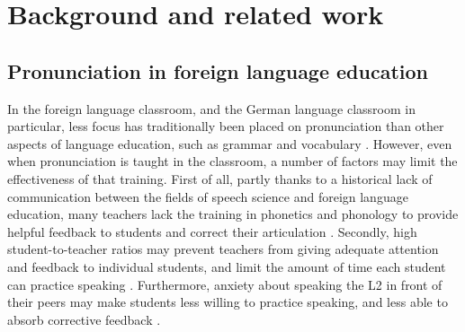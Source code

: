 %
%
\chapter{Background and related work}
\label{chap:background}



	\section{Pronunciation in foreign language education}
	\label{sec:bkgd:l2ed}
%	


In the foreign language classroom, and the German language classroom in particular, less focus has traditionally been placed on pronunciation than other aspects of language education, such as grammar and vocabulary %
\citep{Hirschfeld2007}.
However, even when pronunciation is taught in the classroom, a number of factors may limit the effectiveness of that training. %
First of all, partly thanks to a historical lack of communication between the fields of speech science and foreign language education, many teachers lack the training in phonetics and phonology to provide helpful feedback to students and correct their articulation \citep{Derwing2005,Hirschfeld2007}. Secondly, high student-to-teacher ratios may prevent teachers from giving adequate attention and feedback to individual students, and limit the amount of time each student can practice speaking \citep{Neri2002}. Furthermore, anxiety about speaking the L2 in front of their peers may make students less willing to practice speaking, and less able to absorb corrective feedback \citep{Neri2002}. 




